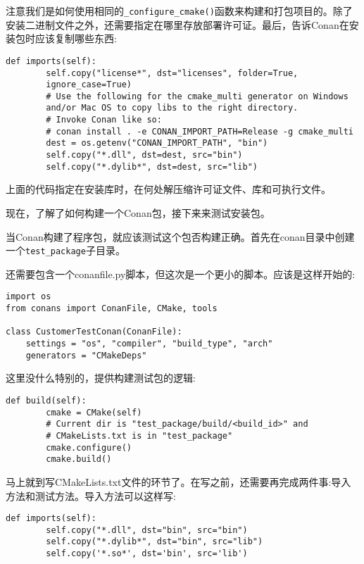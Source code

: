 注意我们是如何使用相同的\texttt{\_configure\_cmake()}函数来构建和打包项目的。除了安装二进制文件之外，还需要指定在哪里存放部署许可证。最后，告诉Conan在安装包时应该复制哪些东西:

\begin{lstlisting}[style=stylePython]
	def imports(self):
		self.copy("license*", dst="licenses", folder=True,
		ignore_case=True)
		# Use the following for the cmake_multi generator on Windows
		and/or Mac OS to copy libs to the right directory.
		# Invoke Conan like so:
		# conan install . -e CONAN_IMPORT_PATH=Release -g cmake_multi
		dest = os.getenv("CONAN_IMPORT_PATH", "bin")
		self.copy("*.dll", dst=dest, src="bin")
		self.copy("*.dylib*", dst=dest, src="lib")
\end{lstlisting}

上面的代码指定在安装库时，在何处解压缩许可证文件、库和可执行文件。

现在，了解了如何构建一个Conan包，接下来来测试安装包。


当Conan构建了程序包，就应该测试这个包否构建正确。首先在conan目录中创建一个\texttt{test\_package}子目录。

还需要包含一个conanfile.py脚本，但这次是一个更小的脚本。应该是这样开始的:

\begin{lstlisting}[style=stylePython]
import os
from conans import ConanFile, CMake, tools

class CustomerTestConan(ConanFile):
	settings = "os", "compiler", "build_type", "arch"
	generators = "CMakeDeps"
\end{lstlisting}

这里没什么特别的，提供构建测试包的逻辑:

\begin{lstlisting}[style=stylePython]
	def build(self):
		cmake = CMake(self)
		# Current dir is "test_package/build/<build_id>" and
		# CMakeLists.txt is in "test_package"
		cmake.configure()
		cmake.build()
\end{lstlisting}

马上就到写CMakeLists.txt文件的环节了。在写之前，还需要再完成两件事:导入方法和测试方法。导入方法可以这样写:

\begin{lstlisting}[style=stylePython]
	def imports(self):
		self.copy("*.dll", dst="bin", src="bin")
		self.copy("*.dylib*", dst="bin", src="lib")
		self.copy('*.so*', dst='bin', src='lib')
\end{lstlisting}

